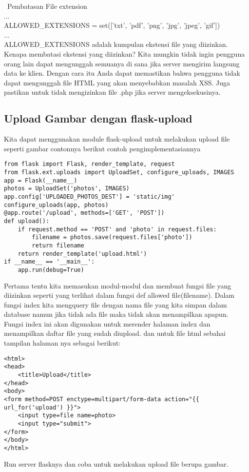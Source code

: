 \documentclass[12pt,a4paper]{article}
\begin{document}
\
Pembatasan File extension\\
...\\
ALLOWED\_EXTENSIONS = set(['txt', 'pdf', 'png', 'jpg', 'jpeg', 'gif'])\\
...\\
ALLOWED\_EXTENSIONS adalah kumpulan ekstensi file yang diizinkan. Kenapa membatasi ekstensi yang diizinkan? Kita mungkin tidak ingin pengguna orang lain dapat mengunggah semuanya di sana jika server mengirim langsung data ke klien. Dengan cara itu Anda dapat memastikan bahwa pengguna tidak dapat mengunggah file HTML yang akan menyebabkan masalah XSS. Juga pastikan untuk tidak mengizinkan file .php jika server mengeksekusinya.
\subsection{Upload Gambar dengan flask-upload}
Kita dapat menggunakan module flask-upload untuk melakukan upload file seperti gambar contonnya berikut contoh pengimplementasiannya
\begin{verbatim}
from flask import Flask, render_template, request
from flask.ext.uploads import UploadSet, configure_uploads, IMAGES
app = Flask(__name__)
photos = UploadSet('photos', IMAGES)
app.config['UPLOADED_PHOTOS_DEST'] = 'static/img'
configure_uploads(app, photos)
@app.route('/upload', methods=['GET', 'POST'])
def upload():
    if request.method == 'POST' and 'photo' in request.files:
        filename = photos.save(request.files['photo'])
        return filename
    return render_template('upload.html')
if __name__ == '__main__':
    app.run(debug=True)
\end{verbatim}
Pertama tentu kita memasukan modul-modul dan membuat fungsi file yang diizinkan seperti yang terlihat dalam fungsi def allowed file(filename). Dalam fungsi index kita mengquery file dengan nama file yang kita simpan dalam database namun jika tidak ada file maka tidak akan menampilkan apapun. Fungsi index ini akan digunakan untuk merender halaman index dan menampilkan daftar file yang sudah diupload.
dan untuk file html sebahai tampilan halaman nya sebagai berikut:
\begin{verbatim}
<html>
<head>
    <title>Upload</title>
</head>
<body>
<form method=POST enctype=multipart/form-data action="{{ url_for('upload') }}">
    <input type=file name=photo>
    <input type="submit">
</form>
</body>
</html>
\end{verbatim}
Run server flasknya dan coba untuk melakukan upload file berupa gambar.
\end{document}
